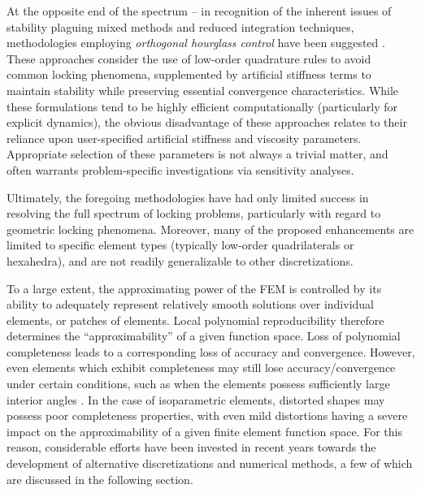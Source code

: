 		At the opposite end of the spectrum -- in recognition of the inherent issues of stability plaguing mixed methods and reduced integration techniques, methodologies employing \textit{orthogonal hourglass control} have been suggested \cite{Flanagan:81}. These approaches consider the use of low-order quadrature rules to avoid common locking phenomena, supplemented by artificial stiffness terms to maintain stability while preserving essential convergence characteristics. While these formulations tend to be highly efficient computationally (particularly for explicit dynamics), the obvious disadvantage of these approaches relates to their reliance upon user-specified artificial stiffness and viscosity parameters. Appropriate selection of these parameters is not always a trivial matter, and often warrants problem-specific investigations via sensitivity analyses.
			
		Ultimately, the foregoing methodologies have had only limited success in resolving the full spectrum of locking problems, particularly with regard to geometric locking phenomena. Moreover, many of the proposed enhancements are limited to specific element types (typically low-order quadrilaterals or hexahedra), and are not readily generalizable to other discretizations.
		
		To a large extent, the approximating power of the FEM is controlled by its ability to adequately represent relatively smooth solutions over individual elements, or patches of elements. Local polynomial reproducibility therefore determines the ``approximability'' of a given function space. Loss of polynomial completeness leads to a corresponding loss of accuracy and convergence. However, even elements which exhibit completeness may still lose accuracy/convergence under certain conditions, such as when the elements possess sufficiently large interior angles \cite{Acosta:00}. In the case of isoparametric elements, distorted shapes may possess poor completeness properties, with even mild distortions having a severe impact on the approximability of a given finite element function space. For this reason, considerable efforts have been invested in recent years towards the development of alternative discretizations and numerical methods, a few of which are discussed in the following section.
		
